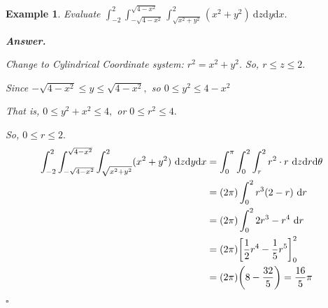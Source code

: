 \documentclass[12pt,a4paper]{article}
\newtheorem{eg}{Example}[subsection]
\newenvironment*{ans}{\par\indent\textbf{\textit{Answer. }}\par}{\par\hfill{$\square$}\par}
\def\dsst{\displaystyle}
\def\d{{\mathrm{d}}}
\def\dx{\d x}
\def\dy{\d y}
\def\dz{\d z}
\begin{document}
\begin{eg}
Evaluate $\dsst\int_{-2}^2\int_{-\sqrt{4-x^2}}^{\sqrt{4-x^2}}\int_{\sqrt{x^2+y^2}}^2(x^2+y^2)\ \dz\dy\dx.$
\begin{ans}
	Change to Cylindrical Coordinate system: $r^2=x^2+y^2.$ So, $r\leq z\leq 2.$\par Since $-\sqrt{4-x^2}\leq y\leq\sqrt{4-x^2},$ so $0\leq y^2\leq4-x^2$\par That is, $0\leq y^2+x^2\leq4,$ or $0\leq r^2\leq4.$\par So, $0\leq r\leq 2.$\[\begin{aligned}\int_{-2}^{2}\int_{-\sqrt{4-x^2}}^{\sqrt{4-x^2}}\int_{\sqrt{x^2+y^2}}^2(x^2+y^2)\ \dz\dy\dx&=\int_0^{\pi}\int_0^2\int_r^2 r^2\cdot r\ \dz\d r\d\theta\\&=(2\pi)\int_0^2r^3(2-r)\ \d r\\&=(2\pi)\int_0^2 2r^3-r^4\ \d r\\&=(2\pi)\qty[\dfrac{1}{2}r^4-\dfrac{1}{5}r^5]_0^2\\&=(2\pi)\qty(8-\dfrac{32}{5})=\dfrac{16}{5}\pi\end{aligned}\]
\end{ans}
\end{eg}
\end{document}

